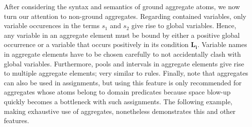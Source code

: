 After considering the syntax and semantics of ground aggregate atoms,
we now turn our attention to non-ground aggregates.
Regarding contained variables,
only variable occurences in the terms $s_1$ and $s_2$ give rise to global variables.
Hence, any variable in an aggregate element must be bound by 
either a positive global occurrence or
a variable that occurs positively in its condition $\boldsymbol{L_i}$.
Variable names in aggregate elements have to be chosen carefully to not accidentally clash with global variables.
Furthermore, pools and intervals in aggregate elements give rise to multiple aggregate elements;
very similar to rules.
Finally, note that aggregates can also be used in assignments,
but using this feature is only recommended for aggregates whose atoms belong to domain predicates
because space blow-up quickly becomes a bottleneck with such assignments.
The following example, making exhaustive use of aggregates,
nonetheless demonstrates this and other features.

